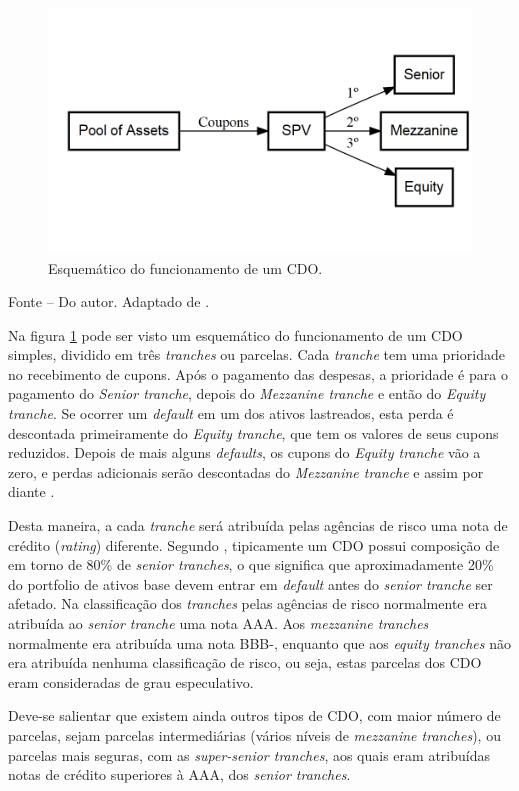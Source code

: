 \documentclass[
	12pt,				%
	oneside,			%
	a4paper,			%
	chapter=TITLE,		%
	section=TITLE,		%
	english,			%
	brazil				%
	]{abntex2}
\newcommand{\bcenter}{\begin{center}}
\newcommand{\ecenter}{\end{center}}
\begin{document}
\begin{refsection}
\begin{figure}[H]
{\centering \includegraphics[width=0.7\linewidth]{images/CDO-1} 

}

\caption{Esquemático do funcionamento de um CDO.}\label{fig:CDO}
\end{figure}
\bcenter

\small Fonte -- Do autor. Adaptado de \textcite{devil}.
\ecenter

Na figura \ref{fig:CDO} pode ser visto um esquemático do funcionamento de um
CDO simples, dividido em três \emph{tranches} ou parcelas. Cada \emph{tranche} tem uma
prioridade no recebimento de cupons. Após o pagamento das despesas, a prioridade
é para o pagamento do \emph{Senior tranche}, depois do \emph{Mezzanine tranche} e então do
\emph{Equity tranche}. Se ocorrer um \emph{default} em um dos ativos lastreados, esta
perda é descontada primeiramente do \emph{Equity tranche}, que tem os valores de seus
cupons reduzidos. Depois de mais alguns \emph{defaults}, os cupons do \emph{Equity
tranche} vão a zero, e perdas adicionais serão descontadas do \emph{Mezzanine
tranche} e assim por diante \autocite[6]{devil}.

Desta maneira, a cada \emph{tranche} será atribuída pelas agências de risco uma nota
de crédito (\emph{rating}) diferente. Segundo \textcite{devil}, tipicamente um \gls{CDO} possui
composição de em torno de 80\% de \emph{senior tranches}, o que significa que
aproximadamente 20\% do portfolio de ativos base devem entrar em \emph{default} antes
do \emph{senior tranche} ser afetado. Na classificação dos \emph{tranches} pelas agências
de risco normalmente era atribuída ao \emph{senior tranche} uma nota AAA. Aos
\emph{mezzanine tranches} normalmente era atribuída uma nota BBB-, enquanto que aos
\emph{equity tranches} não era atribuída nenhuma classificação de risco, ou seja,
estas parcelas dos \gls{CDO} eram consideradas de grau especulativo.

Deve-se salientar que existem ainda outros tipos de \gls{CDO}, com maior número
de parcelas, sejam parcelas intermediárias (vários níveis de \emph{mezzanine
tranches}), ou parcelas mais seguras, com as \emph{super-senior tranches}, aos quais
eram atribuídas notas de crédito superiores à AAA, dos \emph{senior tranches}.


\end{refsection}
\end{document}
